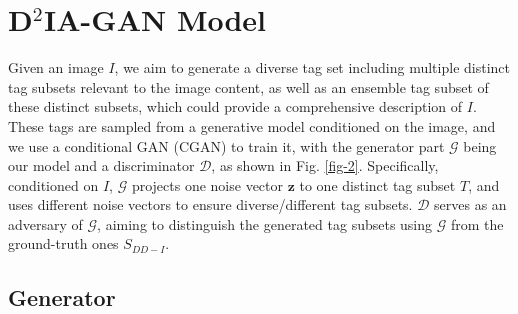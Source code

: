\documentclass[10pt,twocolumn,letterpaper]{article}
\newcommand{\z}{\mathbf{z}}
\newcommand{\D}{\mathcal{D}}
\newcommand{\G}{\mathcal{G}}
\begin{document}
\section{D$^2$IA-GAN Model}
\label{sec: model}

Given an image $I$, we aim to generate a diverse tag set including multiple distinct tag subsets relevant to the image content, as well as an ensemble tag subset of these distinct subsets, which could provide a comprehensive description of $I$.
These tags are sampled from a generative model conditioned on the image, and we use a  conditional GAN (CGAN) \cite{cgan-2014, wenhan-cvpr-2018, face-gan} to train it, with the generator part $\G$ being our model and a discriminator $\D$, as shown in Fig. \ref{fig-2}.
Specifically, conditioned on $I$, $\G$ projects one noise vector $\z$ to one distinct tag subset $T$, and uses different noise vectors to ensure diverse/different tag subsets. 
$\D$ serves as an adversary of $\G$, aiming to distinguish the generated tag subsets using $\G$ from the ground-truth ones $S_{DD-I}$.  

\subsection{Generator}
\end{document}
